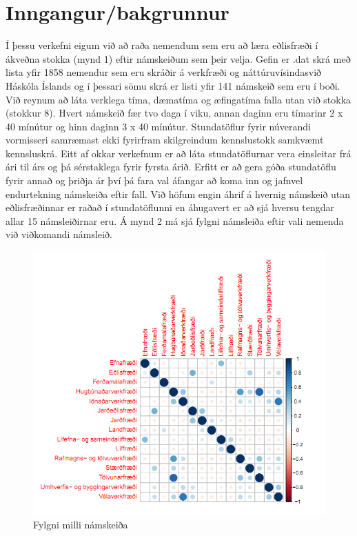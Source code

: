 \documentclass[a4paper,12pt]{article}
\begin{document}
\section{Inngangur/bakgrunnur}
Í þessu verkefni eigum við að raða nemendum sem eru að læra eðlisfræði í ákveðna stokka (mynd 1) eftir námskeiðum sem þeir velja. Gefin er .dat skrá með lista yfir 1858 nemendur sem eru skráðir á verkfræði og náttúruvísindasvið Háskóla Íslands og í þessari sömu skrá er listi yfir 141 námskeið sem eru í boði. Við reynum að láta verklega tíma, dæmatíma og æfingatíma falla utan við stokka (stokkur 8). Hvert námskeið fær tvo daga í viku, annan daginn eru tímarinr 2 x 40 mínútur og hinn daginn 3 x 40 mínútur.
Stundatöflur fyrir núverandi vormisseri samræmast ekki fyrirfram skilgreindum kennslustokk samkvæmt kennsluskrá. Eitt af okkar verkefnum er að láta stundatöflurnar vera einsleitar frá ári til árs og þá sérstaklega fyrir fyrsta árið. Erfitt er að gera góða stundatöflu fyrir annað og þriðja ár því þá fara val áfangar að koma inn og jafnvel endurtekning námskeiða eftir fall.
Við höfum engin áhrif á hvernig námskeið utan eðlisfræðinnar er raðað í stundatöflunni en áhugavert er að sjá hversu tengdar allar 15 námsleiðirnar eru. Á mynd 2 má sjá fylgni námsleiða eftir vali nemenda við viðkomandi námsleið.


\begin{figure}[ht!]
\centering
\includegraphics[scale=0.6]{thyrping}
\caption{Fylgni milli námskeiða}
\label{fig: thyrping}
\end{figure}
\pagebreak
\end{document}
